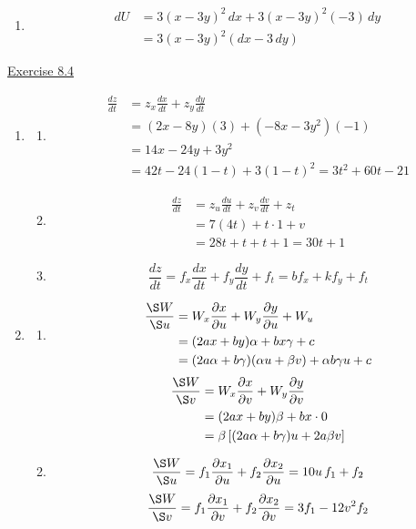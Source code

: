 \begin{enumerate}
\begin{enumerate}
\item[(f)] 
\[\begin{aligned}
dU &= 3(x-3y)^{2}\,dx+3(x-3y)^{2}(-3)\,dy \\
&= 3(x-3y)^{2}\left(dx-3\,dy\right)
\end{aligned}\]

\end{enumerate}

\end{enumerate}

\underline{Exercise 8.4}
\begin{enumerate}
\item[2.]
\begin{enumerate}
\item[(a)] 
\[\begin{aligned}
\frac{dz}{dt} &= z_{x}\frac{dx}{dt}+z_{y}\frac{dy}{dt} \\
&= (2x-8y)(3)+\left(-8x-3y^{2}\right)(-1) \\
&= 14x-24y+3y^{2} \\
&= 42t-24(1-t)+3(1-t)^{2}=3t^{2}+60t-21
\end{aligned}\]

\item[(b)] 
\[\begin{aligned}
\frac{dz}{dt} &= z_{u}\frac{du}{dt}+z_{v}\frac{dv}{dt}+z_{t} \\
&= 7(4t)+t\cdot 1+v \\
&= 28t+t+t+1=30t+1
\end{aligned}\]

\item[(c)] 
\[\frac{dz}{dt}=f_{x}\frac{dx}{dt}+f_{y}\frac{dy}{dt}+f_{t}=bf_{x}+kf_{y}+f_{t}\]

\end{enumerate}

\item[4.]
\begin{enumerate}
\item[(a)] 
\[\begin{aligned}
\frac{\S W}{\S u} &= W_{x}\frac{\partial x}{\partial u}+W_{y}\frac{\partial y}{\partial u}+W_{u} \\
&= (2ax+by)\alpha+bx\gamma+c \\
&= (2a\alpha+b\gamma)(\alpha u+\beta v)+\alpha b\gamma u+c
\end{aligned}\]
\[\begin{aligned}
\frac{\S W}{\S v} &= W_{x}\frac{\partial x}{\partial v}+W_{y}\frac{\partial y}{\partial v} \\
&= (2ax+by)\beta+bx\cdot 0 \\
&= \beta\left[(2a\alpha+b\gamma)u+2a\beta v\right]
\end{aligned}\]

\item[(b)] 
\[\frac{\S W}{\S u}=f_{1}\frac{\partial x_{1}}{\partial u}+f_{2}\frac{\partial x_{2}}{\partial u}=10u\,f_{1}+f_{2}\]
\[\frac{\S W}{\S v}=f_{1}\frac{\partial x_{1}}{\partial v}+f_{2}\frac{\partial x_{2}}{\partial v}=3f_{1}-12v^{2}f_{2}\]

\end{enumerate}

\end{enumerate}
